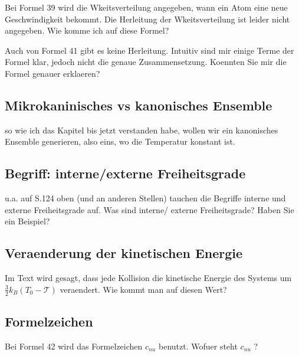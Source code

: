 \documentclass[]{article}
\begin{document}
Bei Formel 39 wird die Wkeitsverteilung angegeben, wann ein Atom eine neue Geschwindigkeit bekommt. Die Herleitung der Wkeitsverteilung ist leider nicht angegeben. Wie komme ich auf diese Formel? 

Auch von Formel 41 gibt es keine Herleitung. Intuitiv sind mir einige Terme der Formel klar, jedoch nicht die genaue Zusammensetzung. Koennten Sie mir die Formel genauer erklaeren? 

\subsection{Mikrokaninisches vs kanonisches Ensemble}
so wie ich das Kapitel bis jetzt verstanden habe, wollen wir ein kanonisches Ensemble generieren, also eins, wo die Temperatur konstant ist. 


\subsection{Begriff: interne/externe Freiheitsgrade}
u.a. auf S.124 oben (und an anderen Stellen) tauchen die Begriffe interne und externe Freiheitsgrade auf. Was sind interne/ externe Freiheitsgrade? Haben Sie ein Beispiel?  

\subsection{Veraenderung der kinetischen Energie}
Im Text wird gesagt, dass jede Kollision die kinetische Energie des Systems um $\frac{3}{2} k_B (T_0-\mathcal{T})$ veraendert. Wie kommt man auf diesen Wert? 

\subsection{Formelzeichen}
Bei Formel 42 wird das Formelzeichen $c_{nu}$ benutzt. Wofuer steht $c_{nu}$ ?
\end{document}
